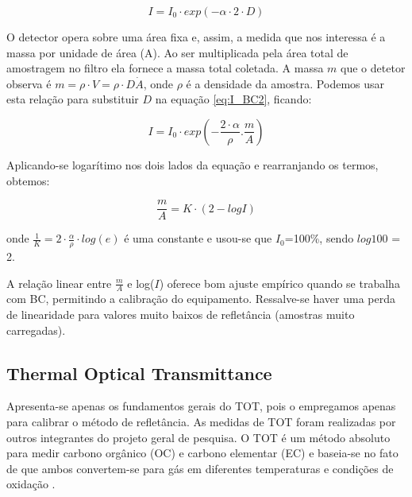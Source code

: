 \begin{equation}
  \label{eq:I_BC2}
  I = I_0 \cdot exp(-\alpha \cdot 2 \cdot D)
\end{equation}

O detector opera sobre uma área fixa e, assim, a medida que nos interessa é a 
massa por unidade de área (A). Ao ser multiplicada pela área total de amostragem
no filtro ela fornece a massa total coletada. A massa $m$ que o detetor observa 
é $m = \rho \cdot V = \rho \cdot D \dot A$, onde $\rho$ é a densidade da amostra. 
Podemos usar esta relação para substituir $D$ na equação \ref{eq:I_BC2}, 
ficando:

\begin{equation}
  \label{m/a}
  I = I_0 \cdot exp \left( -\frac{2 \cdot \alpha}{\rho}.\frac{m}{A} \right)
\end{equation}

Aplicando-se logarítimo nos dois lados da equação e rearranjando os termos, 
obtemos:

\begin{equation}
  \label{m/a_2}
  \frac{m}{A} = K \cdot (2-logI) 
\end{equation}

onde $\frac{1}{K} = 2 \cdot \frac{\alpha}{\rho} \cdot log(e)$
é uma constante e usou-se que $I_0$=100\%, sendo $log 100$ = 2.

A relação linear entre $\frac{m}{A}$ e log($I$) oferece bom ajuste empírico 
quando se trabalha com BC, permitindo a calibração do equipamento. 
Ressalve-se haver uma perda de linearidade para valores muito baixos de 
refletância (amostras muito carregadas).  

\subsection{Thermal Optical Transmittance}

Apresenta-se apenas os fundamentos gerais do TOT, pois o empregamos apenas para
calibrar o método de refletância. As medidas de TOT foram realizadas por outros
integrantes do projeto geral de pesquisa.
O TOT é um método absoluto para medir carbono orgânico (OC) e 
carbono elementar (EC) e baseia-se no fato de que ambos convertem-se para gás 
em diferentes temperaturas e condições de oxidação \citep{birch1998}.


